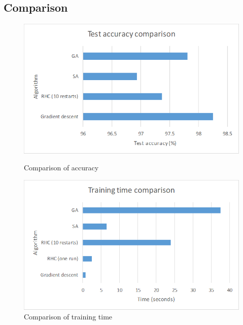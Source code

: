 \documentclass[letterpaper]{article}
\begin{document}
	\subsection{Comparison}
	\label{sec:nn_comp}
	\begin{figure}
		\centering
		\begin{minipage}{.5\textwidth}
			\centering
			\includegraphics[width=\linewidth]{../plots/nn_acc_comparison}
			\caption{Comparison of accuracy}
			\label{fig:comp_acc}
		\end{minipage}%
		\begin{minipage}{.5\textwidth}
			\centering
			\includegraphics[width=\linewidth]{../plots/nn_time_comparison}
			\caption{Comparison of training time}
			\label{fig:comp_time}			
		\end{minipage}
	\end{figure}
\end{document}
